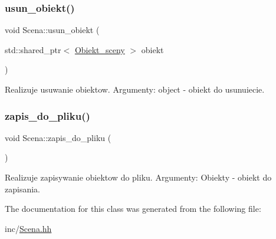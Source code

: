 \subsubsection{\texorpdfstring{usun\_obiekt()}{usun\_obiekt()}}
{\footnotesize\ttfamily void Scena\+::usun\+\_\+obiekt (\begin{DoxyParamCaption}\item[{std\+::shared\+\_\+ptr$<$ \mbox{\hyperlink{class_obiekt__sceny}{Obiekt\+\_\+sceny}} $>$}]{obiekt }\end{DoxyParamCaption})\hspace{0.3cm}{\ttfamily [inline]}}

Realizuje usuwanie obiektow. Argumenty\+: object -\/ obiekt do usunuiecie. \mbox{\label{class_scena_a52ce6283ef4e38d47d4332230172b5eb}} 
\subsubsection{\texorpdfstring{zapis\_do\_pliku()}{zapis\_do\_pliku()}}
{\footnotesize\ttfamily void Scena\+::zapis\+\_\+do\+\_\+pliku (\begin{DoxyParamCaption}{ }\end{DoxyParamCaption})\hspace{0.3cm}{\ttfamily [inline]}}

Realizuje zapisywanie obiektow do pliku. Argumenty\+: Obiekty -\/ obiekt do zapisania. 

The documentation for this class was generated from the following file\+:\begin{DoxyCompactItemize}
\item 
inc/\mbox{\hyperlink{_scena_8hh}{Scena.\+hh}}\end{DoxyCompactItemize}

